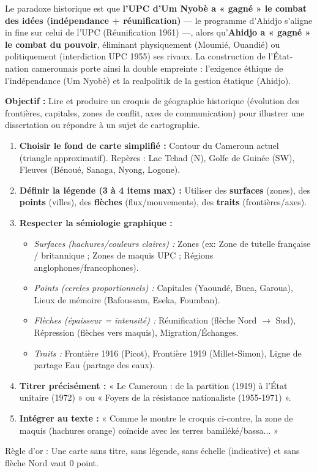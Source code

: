 \documentclass[11pt]{article}
\newcommand{\cle}[1]{{\popxbold\color{popdark}#1}}
\begin{document}
\begin{exoresolu}
Le paradoxe historique est que \textbf{l'UPC d'Um Nyobè a « gagné » le combat des idées (indépendance + réunification)} — le programme d'Ahidjo s'aligne in fine sur celui de l'UPC (Réunification 1961) —, alors qu'\textbf{Ahidjo a « gagné » le combat du pouvoir}, éliminant physiquement (Moumié, Ouandié) ou politiquement (interdiction UPC 1955) ses rivaux. La construction de l'État-nation camerounais porte ainsi la double empreinte : l'exigence éthique de l'indépendance (Um Nyobè) et la realpolitik de la gestion étatique (Ahidjo).
\end{exoresolu}

\begin{methode}
\textbf{Objectif :} Lire et produire un croquis de géographie historique (évolution des frontières, capitales, zones de conflit, axes de communication) pour illustrer une dissertation ou répondre à un sujet de cartographie.
\begin{enumerate}
    \item \textbf{Choisir le fond de carte simplifié :} Contour du Cameroun actuel (triangle approximatif). Repères : Lac Tchad (N), Golfe de Guinée (SW), Fleuves (Bénoué, Sanaga, Nyong, Logone).
    \item \textbf{Définir la légende (3 à 4 items max) :} Utiliser des \textbf{surfaces} (zones), des \textbf{points} (villes), des \textbf{flèches} (flux/mouvements), des \textbf{traits} (frontières/axes).
    \item \textbf{Respecter la sémiologie graphique :}
        \begin{itemize}
            \item \textit{Surfaces (hachures/couleurs claires) :} Zones (ex: Zone de tutelle française / britannique ; Zones de maquis UPC ; Régions anglophones/francophones).
            \item \textit{Points (cercles proportionnels) :} Capitales (Yaoundé, Buea, Garoua), Lieux de mémoire (Bafoussam, Eseka, Foumban).
            \item \textit{Flèches (épaisseur = intensité) :} Réunification (flèche Nord $\rightarrow$ Sud), Répression (flèches vers maquis), Migration/Échanges.
            \item \textit{Traits :} Frontière 1916 (Picot), Frontière 1919 (Millet-Simon), Ligne de partage Eau (partage des eaux).
        \end{itemize}
    \item \textbf{Titrer précisément :} « Le Cameroun : de la partition (1919) à l'État unitaire (1972) » ou « Foyers de la résistance nationaliste (1955-1971) ».
    \item \textbf{Intégrer au texte :} « Comme le montre le croquis ci-contre, la zone de maquis (hachures orange) coïncide avec les terres bamiléké/bassa... »
\end{enumerate}
\cle{Règle d'or :} Une carte sans titre, sans légende, sans échelle (indicative) et sans flèche Nord vaut 0 point.
\end{methode}
\end{document}

